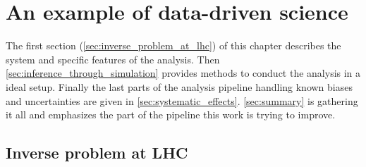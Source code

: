 
\chapter{An example of data-driven science}  %
\label{chap:intro_stat}
\ifpdf
    \graphicspath{{Chapter1/Figs/Raster/}{Chapter1/Figs/PDF/}{Chapter1/Figs/}}
\else
    \graphicspath{{Chapter1/Figs/Vector/}{Chapter1/Figs/}}
\fi










The first section (\autoref{sec:inverse_problem_at_lhc}) of this chapter describes the system and specific features of the analysis.
Then \autoref{sec:inference_through_simulation} provides methods to conduct the analysis in a ideal setup.
Finally the last parts of the analysis pipeline handling known biases and uncertainties are given in \autoref{sec:systematic_effects}.
\autoref{sec:summary} is gathering it all and emphasizes the part of the pipeline this work is trying to improve.



\section{Inverse problem at LHC} %
\label{sec:inverse_problem_at_lhc}







